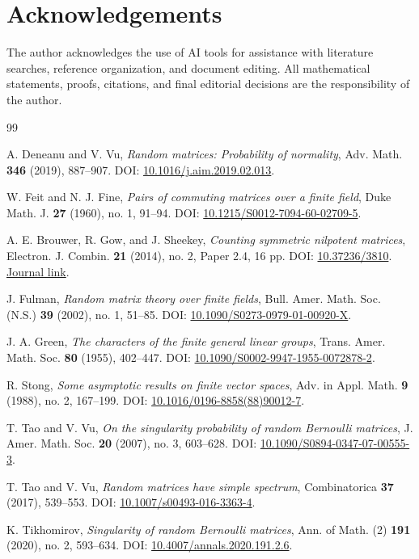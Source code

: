 \documentclass[11pt]{amsart}
\theoremstyle{remark}
\numberwithin{equation}{section}
\begin{document}
\section*{Acknowledgements}

The author acknowledges the use of AI tools for assistance with literature searches, reference organization, and document editing.  All mathematical statements, proofs, citations, and final editorial decisions are the responsibility of the author.
\begin{thebibliography}{99}

A. Deneanu and V. Vu,
\emph{Random matrices: Probability of normality},
Adv. Math. \textbf{346} (2019), 887--907.
DOI: \href{https://doi.org/10.1016/j.aim.2019.02.013}{10.1016/j.aim.2019.02.013}.


W. Feit and N. J. Fine,
\emph{Pairs of commuting matrices over a finite field},
Duke Math. J. \textbf{27} (1960), no. 1, 91--94.
DOI: \href{https://doi.org/10.1215/S0012-7094-60-02709-5}{10.1215/S0012-7094-60-02709-5}.

A. E. Brouwer, R. Gow, and J. Sheekey,
\emph{Counting symmetric nilpotent matrices},
Electron. J. Combin. \textbf{21} (2014), no. 2, Paper 2.4, 16 pp.
DOI: \href{https://doi.org/10.37236/3810}{10.37236/3810}.
\href{https://www.combinatorics.org/ojs/index.php/eljc/article/view/v21i2p4}{Journal link}.

J. Fulman,
\emph{Random matrix theory over finite fields},
Bull. Amer. Math. Soc. (N.S.) \textbf{39} (2002), no. 1, 51--85.
DOI: \href{https://doi.org/10.1090/S0273-0979-01-00920-X}{10.1090/S0273-0979-01-00920-X}.

J. A. Green,
\emph{The characters of the finite general linear groups},
Trans. Amer. Math. Soc. \textbf{80} (1955), 402--447.
DOI: \href{https://doi.org/10.1090/S0002-9947-1955-0072878-2}{10.1090/S0002-9947-1955-0072878-2}.

R. Stong,
\emph{Some asymptotic results on finite vector spaces},
Adv. in Appl. Math. \textbf{9} (1988), no. 2, 167--199.
DOI: \href{https://doi.org/10.1016/0196-8858(88)90012-7}{10.1016/0196-8858(88)90012-7}.

T. Tao and V. Vu,
\emph{On the singularity probability of random Bernoulli matrices},
J. Amer. Math. Soc. \textbf{20} (2007), no. 3, 603--628.
DOI: \href{https://doi.org/10.1090/S0894-0347-07-00555-3}{10.1090/S0894-0347-07-00555-3}.

T. Tao and V. Vu,
\emph{Random matrices have simple spectrum},
Combinatorica \textbf{37} (2017), 539--553.
DOI: \href{https://doi.org/10.1007/s00493-016-3363-4}{10.1007/s00493-016-3363-4}.

K. Tikhomirov,
\emph{Singularity of random Bernoulli matrices},
Ann. of Math. (2) \textbf{191} (2020), no. 2, 593--634.
DOI: \href{https://doi.org/10.4007/annals.2020.191.2.6}{10.4007/annals.2020.191.2.6}.

\end{thebibliography}
\end{document}
